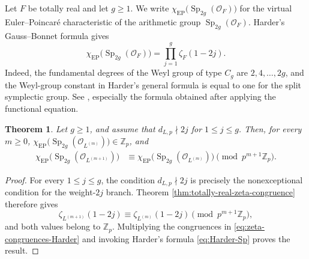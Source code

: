 \documentclass[11pt,table]{amsart}
\newtheorem{theorem}{Theorem}[section]
\numberwithin{equation}{section}
\begin{document}
\par Let \(F\) be totally real and let \(g\geq 1\). We write
\(\chi_{\mathrm{EP}}\bigl(\operatorname{Sp}_{2g}(\mathcal O_F)\bigr)\)
for the virtual Euler--Poincar\'e characteristic of the arithmetic
group \(\operatorname{Sp}_{2g}(\mathcal O_F)\). Harder's
Gauss--Bonnet formula gives
\begin{equation}
        \chi_{\mathrm{EP}}
        \bigl(\operatorname{Sp}_{2g}(\mathcal O_F)\bigr)
        =
        \prod_{j=1}^{g}\zeta_F(1-2j).
        \label{eq:Harder-Sp}
\end{equation}
Indeed, the fundamental degrees of the Weyl group of type \(C_g\) are
\(2,4,\ldots,2g\), and the Weyl-group constant in Harder's general
formula is equal to one for the split symplectic group. See
\cite[\S2.2, p.~453]{Harder1971}, especially the formula obtained
after applying the functional equation.

\begin{theorem}
\label{thm:Euler-characteristic-congruence}
Let \(g\geq 1\), and assume that $d_{L,p}\nmid 2j$ for $1\leq j\leq g$. Then, for every \(m\geq 0\), $\chi_{\mathrm{EP}}
        \bigl(\operatorname{Sp}_{2g}(\mathcal O_{L^{(m)}})\bigr)
        \in\mathbb Z_p$, and
\begin{equation}
\begin{split}
        \chi_{\mathrm{EP}}
        \bigl(\operatorname{Sp}_{2g}(\mathcal O_{L^{(m+1)}})\bigr)
        &\equiv
        \chi_{\mathrm{EP}}
        \bigl(\operatorname{Sp}_{2g}(\mathcal O_{L^{(m)}})\bigr)
        \pmod{p^{m+1}\mathbb Z_p}.
\end{split}
        \label{eq:Euler-congruence}
\end{equation}
\end{theorem}

\begin{proof}
For every \(1\leq j\leq g\), the condition
\(d_{L,p}\nmid2j\) is precisely the nonexceptional condition for the
weight-\(2j\) branch.  Theorem
\ref{thm:totally-real-zeta-congruence} therefore gives
\begin{equation}
        \zeta_{L^{(m+1)}}(1-2j)
        \equiv
        \zeta_{L^{(m)}}(1-2j)
        \pmod{p^{m+1}\mathbb Z_p},
        \label{eq:zeta-congruences-Harder}
\end{equation}
and both values belong to \(\mathbb Z_p\). Multiplying the congruences
in \eqref{eq:zeta-congruences-Harder} and invoking Harder's formula
\eqref{eq:Harder-Sp} proves the result.
\end{proof}
\end{document}
